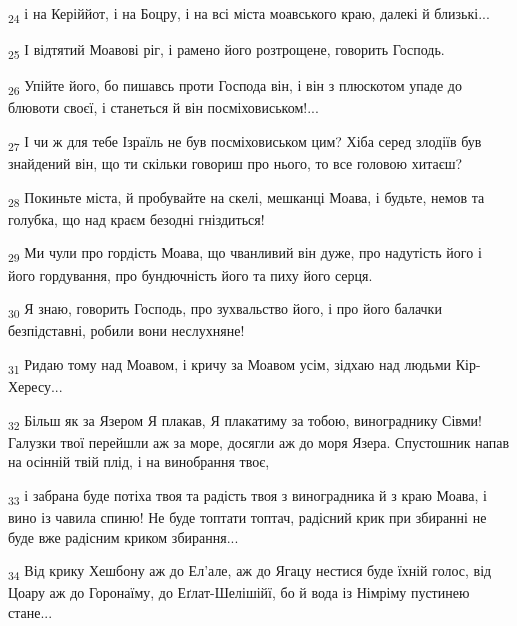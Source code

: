 \begin{tcolorbox}
\textsubscript{24} і на Керіййот, і на Боцру, і на всі міста моавського краю, далекі й близькі...
\end{tcolorbox}
\begin{tcolorbox}
\textsubscript{25} І відтятий Моавові ріг, і рамено його розтрощене, говорить Господь.
\end{tcolorbox}
\begin{tcolorbox}
\textsubscript{26} Упійте його, бо пишавсь проти Господа він, і він з плюскотом упаде до блювоти своєї, і станеться й він посміховиськом!...
\end{tcolorbox}
\begin{tcolorbox}
\textsubscript{27} І чи ж для тебе Ізраїль не був посміховиськом цим? Хіба серед злодіїв був знайдений він, що ти скільки говориш про нього, то все головою хитаєш?
\end{tcolorbox}
\begin{tcolorbox}
\textsubscript{28} Покиньте міста, й пробувайте на скелі, мешканці Моава, і будьте, немов та голубка, що над краєм безодні гніздиться!
\end{tcolorbox}
\begin{tcolorbox}
\textsubscript{29} Ми чули про гордість Моава, що чванливий він дуже, про надутість його і його гордування, про бундючність його та пиху його серця.
\end{tcolorbox}
\begin{tcolorbox}
\textsubscript{30} Я знаю, говорить Господь, про зухвальство його, і про його балачки безпідставні, робили вони неслухняне!
\end{tcolorbox}
\begin{tcolorbox}
\textsubscript{31} Ридаю тому над Моавом, і кричу за Моавом усім, зідхаю над людьми Кір-Хересу...
\end{tcolorbox}
\begin{tcolorbox}
\textsubscript{32} Більш як за Язером Я плакав, Я плакатиму за тобою, винограднику Сівми! Галузки твої перейшли аж за море, досягли аж до моря Язера. Спустошник напав на осінній твій плід, і на винобрання твоє,
\end{tcolorbox}
\begin{tcolorbox}
\textsubscript{33} і забрана буде потіха твоя та радість твоя з виноградника й з краю Моава, і вино із чавила спиню! Не буде топтати топтач, радісний крик при збиранні не буде вже радісним криком збирання...
\end{tcolorbox}
\begin{tcolorbox}
\textsubscript{34} Від крику Хешбону аж до Ел'але, аж до Ягацу нестися буде їхній голос, від Цоару аж до Горонаїму, до Еґлат-Шелішійї, бо й вода із Німріму пустинею стане...
\end{tcolorbox}
